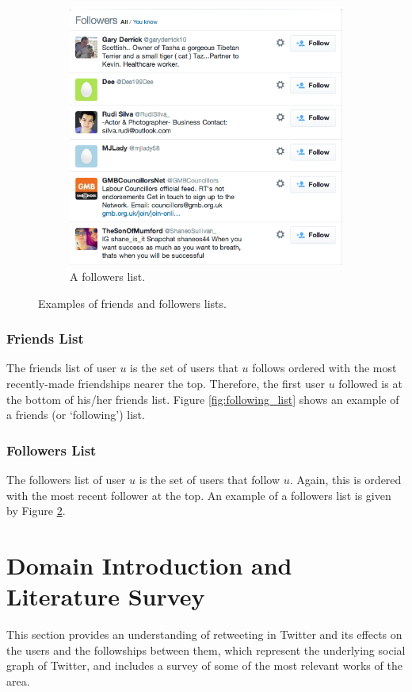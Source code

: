 \begin{figure}[h]
\begin{subfigure}{.5\textwidth}
        \includegraphics[scale=0.4]{2.Background/Media/followers_list.png} 
        \caption{A followers list.}
        \label{fig:followers_list}
    \end{subfigure}
    \caption{Examples of friends and followers lists.}
\end{figure}

\subsubsection{Friends List}
The friends list of user $u$ is the set of users that $u$ follows ordered with the most recently-made friendships nearer the top. Therefore, the first user $u$ followed is at the bottom of his/her friends list. Figure \ref{fig:following_list} shows an example of a friends (or `following') list.

\subsubsection{Followers List}
The followers list of user $u$ is the set of users that follow $u$. Again, this is ordered with the most recent follower at the top. An example of a followers list is given by Figure \ref{fig:followers_list}.


\section{Domain Introduction and Literature Survey}
This section provides an understanding of retweeting in Twitter and its effects on the users and the followships between them, which represent the underlying social graph of Twitter, and includes a survey of some of the most relevant works of the area.

